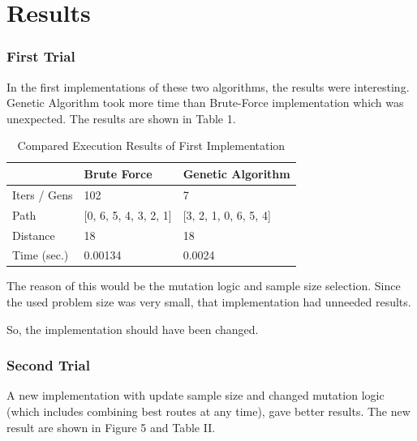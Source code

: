 \documentclass[journal,transmag]{IEEEtran}
\begin{document}
    \section{Results}
    \subsubsection{First Trial}
    In the first implementations of these two algorithms, the results were
    interesting. Genetic Algorithm took more time than Brute-Force
    implementation which was unexpected. The results are shown in
    Table 1.

    \begin{table}[h!]
        \begin{center}
            \begin{tabular}{| l | l | l |}
            \hline
            & Brute Force & Genetic Algorithm \\ \hline
            Iters / Gens & 102 & 7 \\ \hline
            Path & [0, 6, 5, 4, 3, 2, 1] & [3, 2, 1, 0, 6, 5, 4] \\ \hline
            Distance & 18 & 18 \\ \hline
            Time (sec.) & 0.00134 & 0.0024 \\
            \hline
            \end{tabular}
        \end{center}
        \caption{Compared Execution Results of First Implementation}
    \end{table}

    The reason of this would be the mutation logic and sample size selection.
    Since the used problem size was very small, that implementation had unneeded
    results.

    So, the implementation should have been changed. \\

    \subsubsection{Second Trial}
    A new implementation with update sample size and changed mutation logic
    (which includes combining best routes at any time), gave better results. The
    new result are shown in Figure 5 and Table II.
\end{document}
